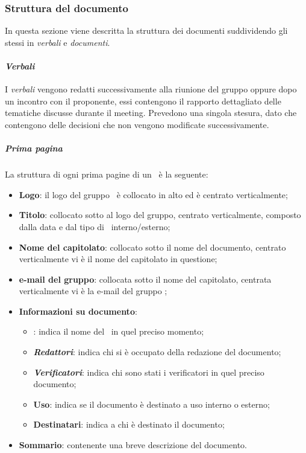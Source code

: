\subsubsection{Struttura del documento}
In questa sezione viene descritta la struttura dei documenti suddividendo gli stessi in \textit{verbali} e \textit{documenti}.
\paragraph{\textit{Verbali}}
I \textit{verbali} vengono redatti successivamente alla riunione del gruppo oppure dopo un incontro con il proponente, essi contengono il rapporto dettagliato delle tematiche discusse durante il meeting. 
Prevedono una singola stesura, dato che contengono delle decisioni che non vengono modificate successivamente.

    \subparagraph{Prima pagina}
    La struttura di ogni prima pagine di un \docNameVLow\ è la seguente:
    \begin{itemize}
        \item \textbf{Logo}: il logo del gruppo \groupName\ è collocato in alto ed è centrato verticalmente;
        \item \textbf{Titolo}: collocato sotto al logo del gruppo, centrato verticalmente, composto dalla data e dal tipo di \docNameVLow\ interno/esterno;
        \item \textbf{Nome del capitolato}: collocato sotto il nome del documento, centrato verticalmente vi è il nome del capitolato in questione;
        \item \textbf{e-mail del gruppo}: collocata sotto il nome del capitolato, centrata verticalmente vi è la e-mail del gruppo \groupName;
        \item \textbf{Informazioni su documento}:
        \begin{itemize}
            \item \textbf{\roleProjectManager}: indica il nome del \roleProjectManagerLow\ in quel preciso momento;
            \item \textbf{\textit{Redattori}}: indica chi si è occupato della redazione del documento;
            \item \textbf{\textit{Verificatori}}: indica chi sono stati i verificatori in quel preciso documento;
            \item \textbf{Uso}: indica se il documento è destinato a uso interno o esterno;
            \item \textbf{Destinatari}: indica a chi è destinato il documento;
        \end{itemize}
        \item \textbf{Sommario}: contenente una breve descrizione del documento.
    \end {itemize}

